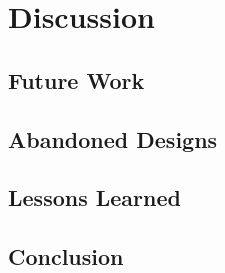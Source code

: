 \chapter{Discussion}

\section{Future Work}
\section{Abandoned Designs}
\section{Lessons Learned}
\section{Conclusion}
